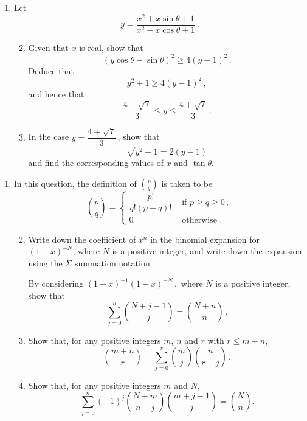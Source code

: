 \documentclass[a4, 11pt]{report}
\newlength{\qspace}
\newcounter{qnumber}
\newenvironment{question}%
 {\vspace{\qspace}
  \begin{enumerate}[\bfseries 1\quad][10]%
    \setcounter{enumi}{\value{qnumber}}%
    \item%
 }
{
  \end{enumerate}
  \filbreak
  \stepcounter{qnumber}
 }
\newenvironment{questionparts}[1][1]%
 {
  \begin{enumerate}[\bfseries (i)]%
    \setcounter{enumii}{#1}
    \addtocounter{enumii}{-1}
    \setlength{\itemsep}{5mm}
    \setlength{\parskip}{8pt}
 }
 {
  \end{enumerate}
 }
\def\le{\leqslant}
\def\ge{\geqslant}
\begin{document}
\begin{question}
Let 
\[
y=\dfrac{x^2+x\sin\theta+1}{x^2+x\cos\theta+1}
\,.\]
\begin{questionparts}
\item
Given that
$x$ is real, show that
\[
(y\cos\theta -\sin\theta)^2 \ge 4 (y-1)^2
\,.
\]
Deduce that 
\[
y^2+1
\ge 
4(y-1)^2 
\,,
\]
and hence that 
\[
\dfrac {4-\sqrt7}3 
\le y \le
\dfrac {4+\sqrt7}3 \,.
\]
\item
In the case $y=   
\dfrac {4+\sqrt7}3 \,$,  show that \[\sqrt{y^2+1}=2(y-1)\]
and find the corresponding values of $x$ and
 $\tan\theta$.
\end{questionparts}


\end{question} 

\begin{question}
In this question, the definition of $\displaystyle\binom pq$ 
is taken to be
\[
\binom pq =
\begin{cases}
\dfrac{p!}{q!(p-q)!} & \text{ if } p\ge q\ge0 \,,\\[4mm]
0 & \text{ otherwise } .
\end{cases}
\]
\begin{questionparts}
\item
Write down the coefficient of $x^n$ in the binomial expansion
for $(1-x)^{-N}$, where $N$ is a positive integer, and write
down the expansion
using the $\Sigma$ summation notation. 

By considering  
$ 
(1-x)^{-1} (1-x)^{-N}
\,
,$ 
where $N$ is a positive integer, show that
\[
\sum_{j=0}^n \binom { N+j -1}{j} = \binom{N+n}{n}\,.
\]
\item
Show that,
for any positive integers $m$, $n$ and $r$ with $r\le m+n$,
\[
\binom{m+n} r = \sum _{j=0}^r \binom m j \binom n {r-j}
\,.
\]

\item
Show that, for any positive integers $m$ and $N$, 
\[
\sum_{j=0}^n(-1)^{j}   \binom {N+m} {n-j} \binom {m+j-1}{j  } =
\displaystyle \binom N n 
.
\]

\end{questionparts}


\end{question}
\end{document}
